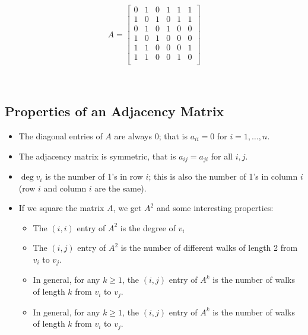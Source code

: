\begin{minipage}{0.35\textwidth}
    \begin{equation*}
        A =  
        \begin{bmatrix}
        0 & 1 & 0 & 1 & 1 & 1 \\
        1 & 0 & 1 & 0 & 1 & 1 \\
        0 & 1 & 0 & 1 & 0 & 0 \\
        1 & 0 & 1 & 0 & 0 & 0 \\
        1 & 1 & 0 & 0 & 0 & 1 \\
        1 & 1 & 0 & 0 & 1 & 0 \\
        \end{bmatrix}
    \end{equation*}
\end{minipage} \hfill
\begin{minipage}{0.55\textwidth}
    \
\end{minipage}

\subsection{Properties of an Adjacency Matrix}
\begin{itemize}
    \item The diagonal entries of $A$ are always 0; that is $a_{ii} = 0$ for $i = 1, \ldots, n$.
    \item The adjacency matrix is symmetric, that is $a_{ij} = a_{ji}$ for all $i, j$.
    \item $\deg v_i$ is the number of 1's in row $i$; this is also the number of 1's in column $i$ (row $i$ and column $i$ are the same). 
    \item If we square the matrix $A$, we get $A^2$ and some interesting properties:
    \begin{itemize}
        \item The $(i, i)$ entry of $A^2$ is the degree of $v_i$
        \item The $(i, j)$ entry of $A^2$ is the number of different walks of length 2 from $v_i$ to $v_j$. 
        \item In general, for any $k \geq 1$, the $(i, j)$ entry of $A^k$ is the number of walks of length $k$ from $v_i$ to $v_j$. 
        \item In general, for any $k \geq 1$, the $(i, j)$ entry of $A^k$ is the number of walks of length $k$ from $v_i$ to $v_j$. 
    \end{itemize}
\end{itemize}

